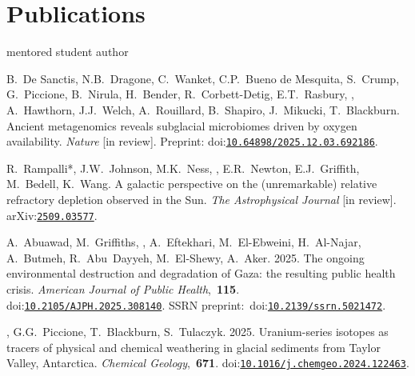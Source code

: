 \section{Publications}
\hfill* mentored student author
\newcommand{\inprep}[1]{\textit{#1} [in prep.]}
\newcommand{\submitted}[1]{\textit{#1} [submitted]}
\newcommand{\inreview}[1]{\textit{#1} [in review]}
\newcommand{\inpress}[1]{\textit{#1} [in press]}
\newcommand{\doi}[1]{doi:\href{https://doi.org/#1}{\texttt{#1}}}
\newcommand{\arxiv}[1]{arXiv:\href{https://arxiv.org/abs/#1}{\texttt{#1}}}
\newcommand{\press}[2]{\textbf{Press:}~\href{#1}{#2}}
\newcommand{\pub}[2]{\textit{#1},~\textbf{#2}}

\begin{etaremune} [itemsep=4pt, leftmargin=3ex]
    \item B.~De Sanctis, N.B.~Dragone, C.~Wanket, C.P.~Bueno de Mesquita, S.~Crump, G.~Piccione, B.~Nirula, H.~Bender, R.~Corbett-Detig, E.T.~Rasbury, \ghedwards, A.~Hawthorn, J.J.~Welch, A.~Rouillard, B.~Shapiro, J.~Mikucki, T.~Blackburn. Ancient metagenomics reveals subglacial microbiomes driven by oxygen availability. \inreview{Nature}. Preprint: \doi{10.64898/2025.12.03.692186}.

    \item R.~Rampalli*, J.W.~Johnson, M.K.~Ness, \ghedwards, E.R.~Newton, E.J.~Griffith, M.~Bedell, K.~Wang. A galactic perspective on the (unremarkable) relative refractory depletion observed in the Sun. \inreview{The Astrophysical Journal}. \arxiv{2509.03577}.

    \item A.~Abuawad, M.~Griffiths, \ghedwards, A.~Eftekhari, M.~El-Ebweini, H.~Al-Najar, A.~Butmeh, R.~Abu~Dayyeh, M.~El-Shewy, A.~Aker. 2025. The ongoing environmental destruction and degradation of Gaza: the resulting public health crisis. \pub{American Journal of Public Health}{115}. \\\doi{10.2105/AJPH.2025.308140}. SSRN preprint:~\doi{10.2139/ssrn.5021472}.
 
    \item \ghedwards, G.G.~Piccione, T.~Blackburn,  S.~Tulaczyk. 2025. Uranium-series isotopes as tracers of physical and chemical weathering in glacial sediments from Taylor Valley, Antarctica. \pub{Chemical Geology}{671}. \doi{10.1016/j.chemgeo.2024.122463}.
        

\end{etaremune}
